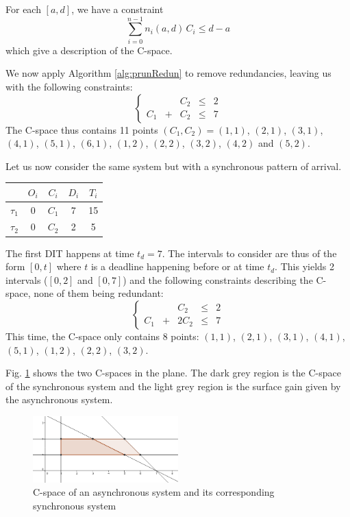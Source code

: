 \documentclass[conference]{IEEEtran}
\begin{document}
For each $[a, d]$, we have a constraint $$\sum_{i=0}^{n-1} n_i(a, d) \, C_i \leqslant d - a$$ which give a description of the C-space.

We now apply Algorithm \ref{alg:prunRedun} to remove redundancies, leaving us with the following constraints:
$$
\left\{
  \begin{array}{ccccc}
    & & C_2 & \leqslant & 2 \\
    C_1 & + & C_2 & \leqslant & 7
  \end{array}
\right.
$$
The C-space thus contains 11 points $(C_1, C_2) = (1, 1)$, $(2, 1)$, $(3, 1)$, $(4, 1)$, $(5, 1)$, $(6, 1)$, $(1, 2)$, $(2, 2)$, $(3, 2)$, $(4, 2)$ and $(5, 2)$.

Let us now consider the same system but with a synchronous pattern of arrival.

    \begin{center}
    \begin{tabular}{|r|c|c|c|c|}
     \hline
      & $O_i$ & $C_i$ & $D_i$ & $T_i$ \\
     \hline
     $\tau_1$ & 0 & $C_1$ & 7 & 15\\
     \hline
     $\tau_2$ & 0 & $C_2$ & 2 & 5\\
     \hline
    \end{tabular}
    \end{center}

The first DIT happens at time $t_d = 7$. The intervals to consider are thus of the form $[0, t]$ where $t$ is a deadline happening before or at time $t_d$. This yields 2 intervals ($[0, 2]$ and $[0, 7]$) and the following constraints describing the C-space, none of them being redundant:
$$
\left\{
  \begin{array}{ccccc}
    & & C_2 & \leqslant & 2 \\
    C_1 & + & 2 C_2 & \leqslant & 7
  \end{array}
\right.
$$
This time, the C-space only contains 8 points: $(1, 1)$, $(2, 1)$, $(3, 1)$, $(4, 1)$, $(5, 1)$, $(1, 2)$, $(2, 2)$, $(3, 2)$.

Fig. \ref{fig:cspaceComp} shows the two C-spaces in the plane. The dark grey region is the C-space of the synchronous system and the light grey region is the surface gain given by the asynchronous system.

\begin{figure}[h]
\begin{center}
  \includegraphics[width=0.5\textwidth]{figs/cspace_example.png}
  \caption{C-space of an asynchronous system and its corresponding synchronous system}
  \label{fig:cspaceComp}
\end{center}
\end{figure}
\end{document}
